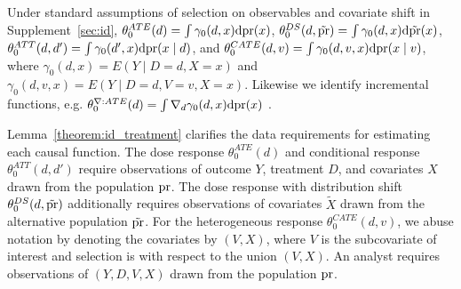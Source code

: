 


\begin{lemma}\label{theorem:id_treatment}
Under standard assumptions of selection on observables and covariate shift in Supplement~\ref{sec:id},
$\theta_0^{ATE}(d)=\int \gamma_0(d,x)\mathrm{d}\text{\normalfont pr}(x)$, $\theta_0^{DS}(d,\tilde{\text{\normalfont pr}})=\int \gamma_0(d,x)\mathrm{d}\tilde{\text{\normalfont pr}}(x)$, $\theta_0^{ATT}(d,d')=\int \gamma_0(d',x)\mathrm{d}\text{\normalfont pr}(x \mid d)$, and $\theta_0^{CATE}(d,v)=\int \gamma_0(d,v,x)\mathrm{d}\text{\normalfont pr}(x \mid v)$, 
where $\gamma_0(d,x)=E(Y \mid D=d,X=x)$ and $\gamma_0(d,v,x)=E(Y \mid D=d,V=v,X=x)
$. Likewise we identify incremental functions, e.g. $\theta_0^{\nabla:ATE}(d)=\int \nabla_d \gamma_0(d,x)\mathrm{d}\text{\normalfont pr}(x)$ \cite{altonji2005cross}.
\end{lemma}

Lemma~\ref{theorem:id_treatment} clarifies the data requirements for estimating each causal function. The dose response $\theta_0^{ATE}(d)$ and conditional response $\theta_0^{ATT}(d,d')$ require observations of outcome $Y$, treatment $D$, and covariates $X$ drawn from the population $\text{\normalfont pr}$. The dose response with distribution shift $\theta_0^{DS}(d,\tilde{\text{\normalfont pr}})$ additionally requires observations of covariates $\tilde{X}$ drawn from the alternative population $\tilde{\text{\normalfont pr}}$. For the heterogeneous response $\theta_0^{CATE}(d,v)$, we abuse notation by denoting the covariates by $(V,X)$, where $V$ is the subcovariate of interest and selection is with respect to the union $(V,X)$. An analyst requires observations of $(Y,D,V,X)$ drawn from the population $\text{\normalfont pr}$.

